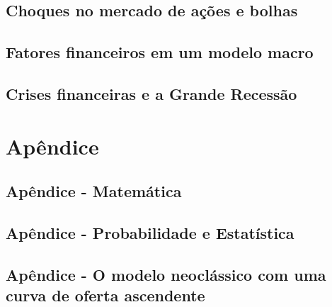 \documentclass[a4paper,11pt]{book}
\theoremstyle{definition}
\begin{document}
\chapter{Choques no mercado de ações e bolhas}

\chapter{Fatores financeiros em um modelo macro}

\chapter{Crises financeiras e a Grande Recessão}

\part{Apêndice}

\chapter{Apêndice - Matemática}

\chapter{Apêndice - Probabilidade e Estatística}

\chapter{Apêndice - O modelo neoclássico com uma curva de oferta ascendente}
\end{document}

